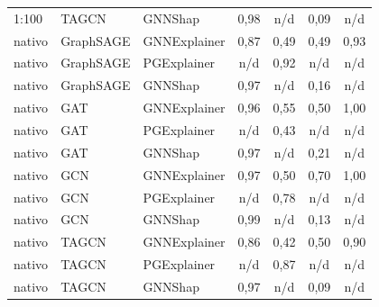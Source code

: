 \begin{longtable}{lll cccc}
1:100 & TAGCN & GNNShap & 0,98 & n/d & 0,09 & n/d \\
nativo & GraphSAGE & GNNExplainer & 0,87 & 0,49 & 0,49 & 0,93 \\
nativo & GraphSAGE & PGExplainer & n/d & 0,92 & n/d & n/d \\
nativo & GraphSAGE & GNNShap & 0,97 & n/d & 0,16 & n/d \\
nativo & GAT & GNNExplainer & 0,96 & 0,55 & 0,50 & 1,00 \\
nativo & GAT & PGExplainer & n/d & 0,43 & n/d & n/d \\
nativo & GAT & GNNShap & 0,97 & n/d & 0,21 & n/d \\
nativo & GCN & GNNExplainer & 0,97 & 0,50 & 0,70 & 1,00 \\
nativo & GCN & PGExplainer & n/d & 0,78 & n/d & n/d \\
nativo & GCN & GNNShap & 0,99 & n/d & 0,13 & n/d \\
nativo & TAGCN & GNNExplainer & 0,86 & 0,42 & 0,50 & 0,90 \\
nativo & TAGCN & PGExplainer & n/d & 0,87 & n/d & n/d \\
nativo & TAGCN & GNNShap & 0,97 & n/d & 0,09 & n/d \\
\end{longtable}
